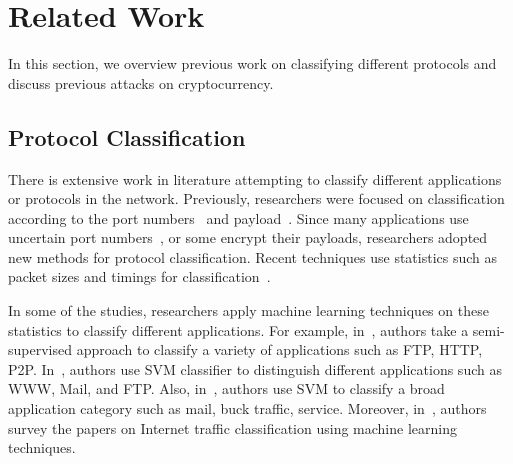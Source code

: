 
\section{Related Work}\label{related}


In this section, we overview previous work on 
classifying different protocols and discuss previous attacks on \bc cryptocurrency.

\subsection{Protocol Classification}
There is extensive work in literature attempting to classify different applications or protocols in the network. Previously, researchers were focused on classification according to the port numbers~\cite{tcp_p2p,ports,port_mad,payload_p2p} and payload~\cite{payload_p2p,payload_content,payload_app,payload_moore}. Since many applications use uncertain port numbers~\cite{ports}, or some encrypt their payloads, researchers adopted new methods for protocol classification.
Recent techniques use statistics such as packet sizes and timings for classification~\cite{real_enc,web_p2p,blinc,prot_fing,semi,trafficClassSVM,svm2}. 

In some of the studies, researchers apply machine learning techniques on these statistics to classify different applications.%
For example, in~\cite{semi}, authors take a semi-supervised approach to classify a variety of applications such as FTP, HTTP, P2P.  
In~\cite{trafficClassSVM,svm2}, authors use SVM classifier to distinguish different applications such as WWW, Mail, and FTP. Also, in~\cite{svm2}, authors use SVM to classify a broad application category such as mail, buck traffic, service. Moreover, in~\cite{survey_ml,myth}, authors survey the papers on Internet traffic classification using machine learning techniques.
\begin{comment}
In~\cite{MooreZ05}, Andrew W. Moore et al. use two refinements on the Bayesian technique and show that they can reach $95\%$ of accuracy on Internet traffic classification. Moreover, in~\cite{bays2}, authors use the Bayesian neural network to classify Internet traffic using just header-derived statistics. 
 In ~\cite{mlEffi}, Wei Li et al. use C4.5~\cite{tree} decision tree to classify Internet traffic such as mail, gaming, database, and browsing. They reach an accuracy of $99.8$, using $12$ features collected at the start of the flow.
   \end{comment}
 
